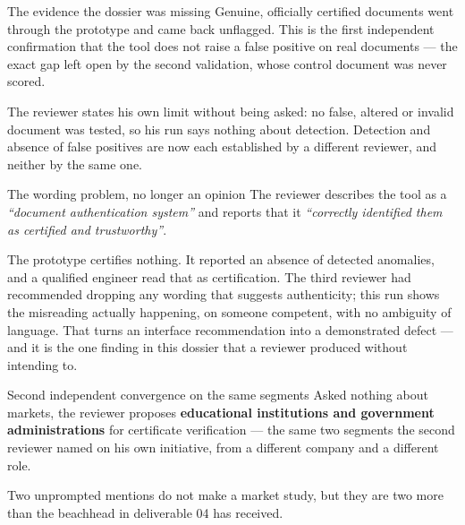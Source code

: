 \documentclass[10pt,a4paper]{article}
\begin{document}
\vspace{2pt}
\begin{goodbox}{The evidence the dossier was missing}
Genuine, officially certified documents went through the prototype and came back
unflagged. This is the first independent confirmation that the tool does not
raise a false positive on real documents --- the exact gap left open by the
second validation, whose control document was never scored.

\vspace{3pt}
The reviewer states his own limit without being asked: no false, altered or
invalid document was tested, so his run says nothing about detection. Detection
and absence of false positives are now each established by a different reviewer,
and neither by the same one.
\end{goodbox}

\vspace{4pt}
\begin{badbox}{The wording problem, no longer an opinion}
The reviewer describes the tool as a \emph{``document authentication system''}
and reports that it \emph{``correctly identified them as certified and
trustworthy''}.

\vspace{3pt}
The prototype certifies nothing. It reported an absence of detected anomalies,
and a qualified engineer read that as certification. The third reviewer had
recommended dropping any wording that suggests authenticity; this run shows the
misreading actually happening, on someone competent, with no ambiguity of
language. That turns an interface recommendation into a demonstrated defect ---
and it is the one finding in this dossier that a reviewer produced without
intending to.
\end{badbox}

\vspace{4pt}
\begin{note}{Second independent convergence on the same segments}
Asked nothing about markets, the reviewer proposes \textbf{educational
institutions and government administrations} for certificate verification ---
the same two segments the second reviewer named on his own initiative, from a
different company and a different role.

\vspace{3pt}
Two unprompted mentions do not make a market study, but they are two more than
the beachhead in deliverable 04 has received.
\end{note}
\end{document}
